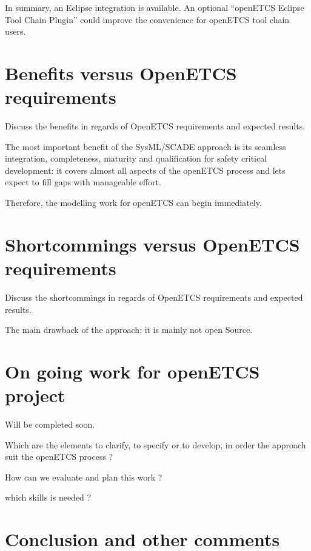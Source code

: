 In summary, an Eclipse integration is available. An optional "`openETCS Eclipse Tool Chain Plugin"' could improve the convenience for openETCS tool chain users. 


\section{Benefits versus OpenETCS requirements}

\begin{todo_comment}
Discuss the benefits in regards of OpenETCS requirements and expected results.
\end{todo_comment}

The most important benefit of the SysML/SCADE approach is its seamless integration, completeness, maturity and qualification for safety critical development: it covers almost all aspects of the openETCS process and lets expect to fill gaps with manageable effort.    

Therefore, the modelling work for openETCS can begin immediately. 

\section{Shortcommings versus OpenETCS requirements}

\begin{todo_comment}
Discuss the shortcommings in regards of OpenETCS requirements and expected results.
\end{todo_comment}

The main drawback of the approach: it is mainly not open Source. 

\section{On going work for openETCS project}

Will be completed soon.

\begin{todo_comment}
Which are the elements to clarify, to specify or to develop, in order the approach suit the openETCS process ?

How can we evaluate and plan this work ?

which skills is needed ?
\end{todo_comment}

\section{Conclusion and other comments}
